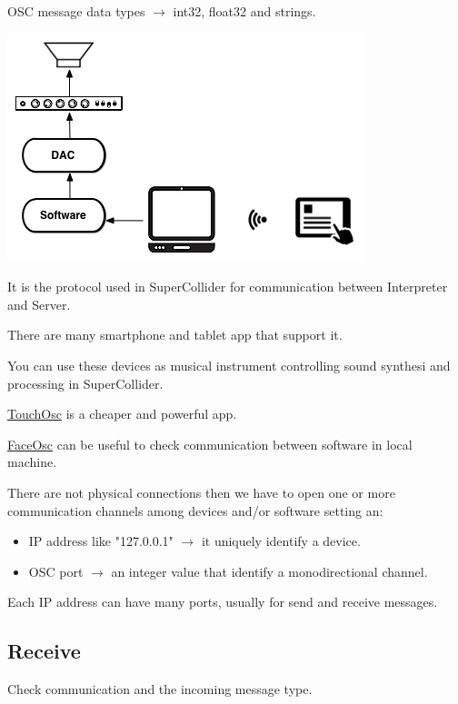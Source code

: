 OSC message data types \(\rightarrow\) int32, float32 and strings.

\begin{center}
\includegraphics[scale=0.7]{../img/osc_1.png}
\end{center}

It is the protocol used in SuperCollider for communication between Interpreter and Server.

There are many smartphone and tablet app that support it.

You can use these devices as musical instrument controlling sound synthesi and processing in SuperCollider.

\href{https://hexler.net/touchosc}{TouchOsc} is a cheaper and powerful app.

\href{https://github.com/kylemcdonald/ofxFaceTracker/releases}{FaceOsc} can be useful to check communication between software in local machine.

There are not physical connections then we have to open one or more communication channels among devices and/or software setting an:

\begin{itemize}
\tightlist
\item IP address like "127.0.0.1" \(\rightarrow\) it uniquely identify a device.
\item OSC port \(\rightarrow\) an integer value that identify a monodirectional channel.
\end{itemize}

Each IP address can have many ports, usually for send and receive messages.

\subsection{Receive}\label{receive-osc}

Check communication and the incoming message type.

